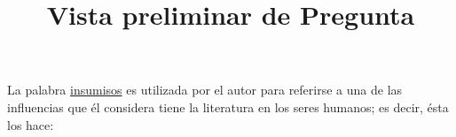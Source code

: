 \documentclass[a4paper,10pt]{article}\usepackage[utf8]{inputenc}\usepackage[spanish]{babel}\usepackage{times}
\title{Vista preliminar de Pregunta}
\begin{document}
\twocolumn 

\maketitle

La palabra \underline{ insumisos} es utilizada por el autor para referirse a una de las influencias que él considera tiene la literatura en los seres humanos; es decir, ésta los hace:
\end{document}
